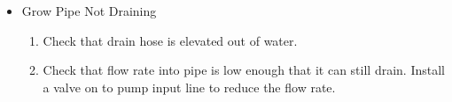 \documentclass[american,12pt]{article}
\begin{document}
\begin{itemize}
	\item Grow Pipe Not Draining
	\begin{enumerate}
		\item Check that drain hose is elevated out of water.
		\item Check that flow rate into pipe is low enough that it can still 
			drain. Install a valve on to pump input line to reduce the flow 
			rate.
	\end{enumerate}
\end{itemize}

\newpage
\printbibliography
\end{document}
